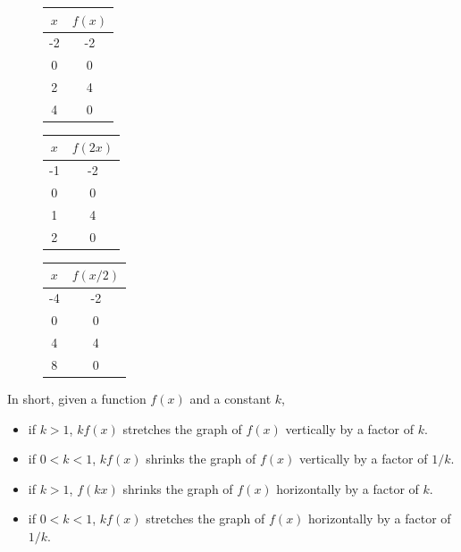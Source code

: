 \documentclass[12pt]{article}
\newcommand{\widththreefigures}{0.32\textwidth}
\begin{document}
\newpage

\begin{figure}[htp]
\centering
\begin{minipage}[t]{\widththreefigures}
\centering
\vspace{0pt}
\begin{tabular}{c|c}
$x$	& $f(x)$\\ \hline
-2	& -2\\ \hline
0	& 0	\\ \hline
2	& 4	\\ \hline
4	& 0	\\
\end{tabular}
\end{minipage}\hfill
\begin{minipage}[t]{\widththreefigures}
\centering
\vspace{0pt}
\begin{tabular}{c|c}
$x$	& $f(2x)$ \\ \hline
-1	& -2 \\ \hline
0	& 0	\\ \hline
1	& 4	\\ \hline
2	& 0	\\
\end{tabular}
\end{minipage}
\begin{minipage}[t]{\widththreefigures}
\centering
\vspace{0pt}
\begin{tabular}{c|c}
$x$	& $f(x/2)$ \\ \hline
-4	& -2 \\ \hline
0	& 0\\ \hline
4	& 4\\ \hline
8	& 0 \\
\end{tabular}
\end{minipage}
\end{figure}

In short, given a function $f(x)$ and a constant $k$,
\begin{itemize}
	\item if $k > 1$, $kf(x)$ stretches the graph of $f(x)$ vertically by a factor of $k$.
	\item if $0 < k < 1$, $kf(x)$ shrinks the graph of $f(x)$ vertically by a factor of $1/k$.
	\item if $k > 1$, $f(kx)$ shrinks the graph of $f(x)$ horizontally by a factor of $k$.
	\item if $0 < k < 1$, $kf(x)$ stretches the graph of $f(x)$ horizontally by a factor of $1/k$.
\end{itemize}
\end{document}
